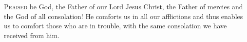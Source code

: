 
\lettrine{P}{raised} be God, the Father of our Lord Jesus Christ, the Father of mercies and the God of all consolation! He comforts us in all our afflictions and thus enables us to comfort those who are in trouble, with the same consolation we have received from him.
